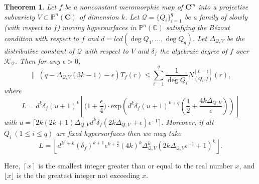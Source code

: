\documentclass[12pt,leqno]{amsart}
\newtheorem{theorem}[equation]{Theorem}
\newcommand{\C}{{\mathbb{C}}}
\renewcommand{\P}{{\mathbb{P}}}
\numberwithin{equation}{section}
\begin{document}
\begin{theorem}\label{1.1}
Let $f$ be a nonconstant meromorphic map of $\mathbf{C}^m$ into a projective subvariety $V\subset\P^n(\mathbf{C})$ of dimension $k$. Let $\mathcal Q=\{Q_i\}_{i=1}^q$ be a family of slowly (with respect to $f$) moving hypersurfaces in $\P^n(\C)$ satisfying the B\'{e}zout condition with respect to $f$ and $d=lcd(\deg Q_1,\ldots,\deg Q_q)$. Let $\Delta_{\mathcal Q,V}$ be the distributive constant of $\mathcal Q$ with respect to $V$ and $\delta_f$ the algebraic degree of $f$ over $\mathcal K_{\mathcal Q}$. Then for any $\epsilon >0$, 
$$  \|\ (q-\Delta_{\mathcal Q,V}(3k-1)-\epsilon)T_f(r)\le \sum_{i=1}^{q}\dfrac{1}{\deg Q_i}N^{[L-1]}_{(Q_i,f)}(r),$$
where $$L=d^k\delta_f(u+1)^k\left\lfloor\biggl(1+\frac{\epsilon}{4}\biggl)\cdot\mathrm{exp}\left(d^k\delta_f(u+1)^{k+q}\left(\frac{1}{2}+\frac{4k\Delta_{Q,V}}{\epsilon}\right)\right)\right\rfloor$$
with $u=\lceil 2k(2k+1)\Delta_{Q,V}d^k\delta_f(2k\Delta_{Q,V}+\epsilon)\epsilon^{-1}\rceil$. Moreover, if all $Q_i\ (1\le i\le q)$ are fixed hypersurfaces then we may take 
$$L=\left\lfloor d^{k^2+k}(\delta_f)^{k+1}e^{k+\frac{3}{2}}(4k)^k\Delta_{\mathcal Q,V}^k(2k\Delta_{\mathcal Q,V}\epsilon^{-1}+1)^k\right\rfloor.$$
\end{theorem} 

Here, $\left\lceil x\right\rceil$ is the smallest integer greater than or equal to the real number $x$, and $\lfloor x\rfloor$ is the the greatest integer not exceeding $x$.
\end{document}
